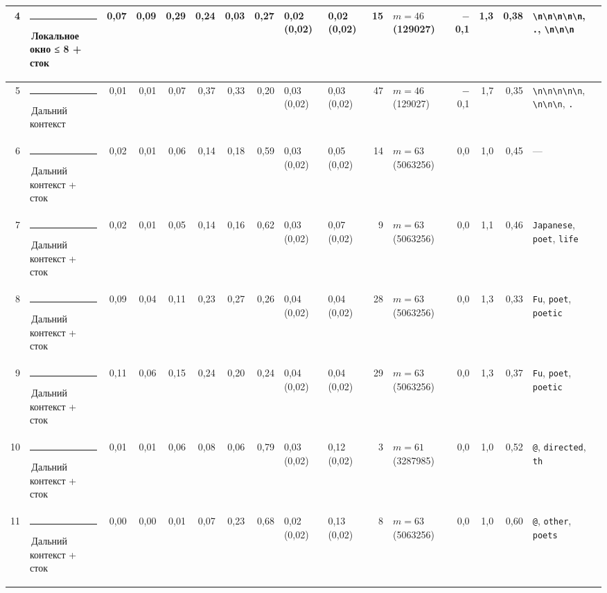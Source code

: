 \documentclass[10pt]{article}
\begin{document}
\begin{minipage}{\linewidth}
\begin{center}
{\begin{tabular}{|r|l|r|r|r|r|r|r|l|l|r|l|r|r|r|l|}
4 & \textcolor[HTML]{1BAF7A}{\rule{0.62em}{0.62em}}\,\textbf{Локальное окно ≤ 8 + сток} & 0,07 & 0,09 & 0,29 & 0,24 & 0,03 & 0,27 & 0,02 (0,02) & 0,02 (0,02) & 15 & $m{=}46$ (129027) & $-$0,1 & 1,3 & 0,38 & \texttt{\textvisiblespace{}\textbackslash{}n\textbackslash{}n\textbackslash{}n\textbackslash{}n\textbackslash{}n}, \texttt{\textvisiblespace{}.}, \texttt{\textvisiblespace{}\textbackslash{}n\textbackslash{}n\textbackslash{}n} \\ \hline
5 & \textcolor[HTML]{C3C2B7}{\rule{0.62em}{0.62em}}\,Дальний контекст & 0,01 & 0,01 & 0,07 & 0,37 & 0,33 & 0,20 & 0,03 (0,02) & 0,03 (0,02) & 47 & $m{=}46$ (129027) & $-$0,1 & 1,7 & 0,35 & \texttt{\textvisiblespace{}\textbackslash{}n\textbackslash{}n\textbackslash{}n\textbackslash{}n\textbackslash{}n}, \texttt{\textvisiblespace{}\textbackslash{}n\textbackslash{}n\textbackslash{}n}, \texttt{\textvisiblespace{}.} \\ \hline
6 & \textcolor[HTML]{C3C2B7}{\rule{0.62em}{0.62em}}\,Дальний контекст + сток & 0,02 & 0,01 & 0,06 & 0,14 & 0,18 & 0,59 & 0,03 (0,02) & 0,05 (0,02) & 14 & $m{=}63$ (5063256) & 0,0 & 1,0 & 0,45 & — \\ \hline
7 & \textcolor[HTML]{C3C2B7}{\rule{0.62em}{0.62em}}\,Дальний контекст + сток & 0,02 & 0,01 & 0,05 & 0,14 & 0,16 & 0,62 & 0,03 (0,02) & 0,07 (0,02) & 9 & $m{=}63$ (5063256) & 0,0 & 1,1 & 0,46 & \texttt{\textvisiblespace{}Japanese}, \texttt{\textvisiblespace{}poet}, \texttt{\textvisiblespace{}life} \\ \hline
8 & \textcolor[HTML]{C3C2B7}{\rule{0.62em}{0.62em}}\,Дальний контекст + сток & 0,09 & 0,04 & 0,11 & 0,23 & 0,27 & 0,26 & 0,04 (0,02) & 0,04 (0,02) & 28 & $m{=}63$ (5063256) & 0,0 & 1,3 & 0,33 & \texttt{\textvisiblespace{}Fu}, \texttt{\textvisiblespace{}poet}, \texttt{\textvisiblespace{}poetic} \\ \hline
9 & \textcolor[HTML]{C3C2B7}{\rule{0.62em}{0.62em}}\,Дальний контекст + сток & 0,11 & 0,06 & 0,15 & 0,24 & 0,20 & 0,24 & 0,04 (0,02) & 0,04 (0,02) & 29 & $m{=}63$ (5063256) & 0,0 & 1,3 & 0,37 & \texttt{\textvisiblespace{}Fu}, \texttt{\textvisiblespace{}poet}, \texttt{\textvisiblespace{}poetic} \\ \hline
10 & \textcolor[HTML]{C3C2B7}{\rule{0.62em}{0.62em}}\,Дальний контекст + сток & 0,01 & 0,01 & 0,06 & 0,08 & 0,06 & 0,79 & 0,03 (0,02) & 0,12 (0,02) & 3 & $m{=}61$ (3287985) & 0,0 & 1,0 & 0,52 & \texttt{\textvisiblespace{}@}, \texttt{\textvisiblespace{}directed}, \texttt{th} \\ \hline
11 & \textcolor[HTML]{C3C2B7}{\rule{0.62em}{0.62em}}\,Дальний контекст + сток & 0,00 & 0,00 & 0,01 & 0,07 & 0,23 & 0,68 & 0,02 (0,02) & 0,13 (0,02) & 8 & $m{=}63$ (5063256) & 0,0 & 1,0 & 0,60 & \texttt{\textvisiblespace{}@}, \texttt{\textvisiblespace{}other}, \texttt{\textvisiblespace{}poets} \\ \hline

\end{tabular}}
\end{center}
\end{minipage}
\end{document}
